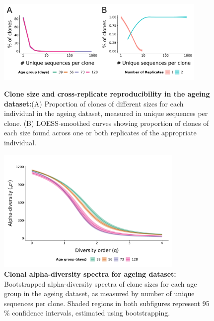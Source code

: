 \begin{figure}
\centering
\includegraphics[width = 0.9\textwidth]{_Figures/png/ageing-clone-sizes}
\begin{subfigure}{0em}
\label{fig:igseq-ageing-clone-sizes-sizes}
\end{subfigure}
\begin{subfigure}{0em}
\label{fig:igseq-ageing-clone-sizes-reps}
\end{subfigure}
\caption[Clone size and cross-replicate reproducibility in the \igseq ageing dataset]{\textbf{Clone size and cross-replicate reproducibility in the \igseq ageing dataset:}(A) Proportion of clones of different sizes for each individual in the ageing dataset, measured in unique sequences per clone. (B) LOESS-smoothed curves \parencite{cleveland1992loess} showing proportion of clones of each size found across one or both replicates of the appropriate individual.}
\label{fig:igseq-ageing-clone-sizes}
\end{figure}

\begin{figure}
\centering
\includegraphics[width = 0.8\textwidth]{_Figures/png/ageing-clone-diversity-alpha}
\caption[Clonal alpha-diversity spectra for \igseq ageing dataset]{\textbf{Clonal alpha-diversity spectra for \igseq ageing dataset:} Bootstrapped alpha-diversity spectra of clone sizes for each age group in the \igseq ageing dataset, as measured by number of unique sequences per clone. Shaded regions in both subfigures represent 95\,\% confidence intervals, estimated using bootstrapping.}
\label{fig:igseq-ageing-clone-diversity-alpha}
\end{figure}

